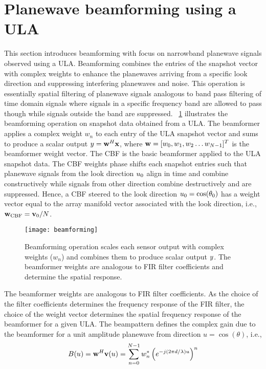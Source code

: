 \section{Planewave beamforming using a ULA}
\label{sec:beamforming} 
This section introduces beamforming with focus on narrowband planewave
signals observed using a ULA. Beamforming combines the entries of the
snapshot vector with complex weights to enhance the planewaves
arriving from a specific look direction and suppressing interfering
planewaves and noise. This operation is essentially spatial filtering
of planewave signals analogous to band pass filtering of time domain
signals where signals in a specific frequency band are allowed to pass
though while signals outside the band are
suppressed. \figurename{}~\ref{fig:beamformer} illustrates the
beamforming operation on snapshot data obtained from a ULA. The
beamformer applies a complex weight $w_n$
to each entry of the ULA snapshot vector and sums to produce a scalar
output $ y = {\bf w}^H{\bf x}$,
where ${\bf w} = [w_0, w_1, w_2\ldots w_{N-1}]^{T}$
is the beamformer weight vector. The CBF is the basic beamformer
applied to the ULA snapshot data. The CBF weights phase shifts each
snapshot entries such that planewave signals from the look direction
$u_0$
align in time and combine constructively while signals from other
direction combine destructively and are suppressed. Hence, a CBF
steered to the look direction $u_0 = \cos(\theta_0)$
has a weight vector equal to the array manifold vector associated with
the look direction, i.e., ${\bf w}_{\rm CBF} = {\bf v}_0/N$.
\begin{figure} \centering
    \texttt{[image: beamforming]}
    \caption[Beamforming operation
      scales each sensor output with complex weights.]{Beamforming operation
      scales each sensor output with complex weights ($w_n$) and
      combines them to produce scalar output $y$. The beamformer
      weights are analogous to FIR filter coefficients and determine
      the spatial response.}
    \label{fig:beamformer}
\end{figure}
The beamformer weights are analogous to FIR filter coefficients. As
the choice of the filter coefficients determines the frequency
response of the FIR filter, the choice of the weight vector determines
the spatial frequency response of the beamformer for a given ULA. The
beampattern defines the complex gain due to the beamformer for a unit
amplitude planewave from direction $u = \cos(\theta)$, i.e.,
\begin{equation}
  \label{eq:beampatu} 
  B(u) = {\bf w}^H{\bf v}(u) = \sum_{n=0}^{N-1}w_n^*\left(e^{-j(2\pi d /\lambda) u}\right)^n
\end{equation}
